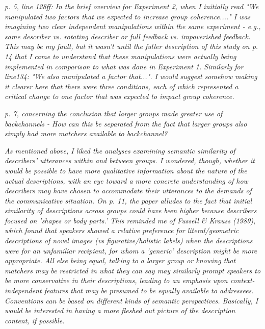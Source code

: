 \documentclass{stanfordletter}
\newcommand{\theysaid}[1]{\begin{leftbar} \noindent 
		\textsl{ #1}\end{leftbar}}
\begin{document}
\begin{letter}{}
          
          \theysaid{p. 5, line 128ff: In the brief overview for Experiment 2, when I initially read "We manipulated two factors that we expected to increase group coherence...." I was imagining two clear independent manipulations within the same experiment - e.g., same describer vs. rotating describer or full feedback vs. impoverished feedback. This may be my fault, but it wasn't until the fuller description of this study on p. 14 that I came to understand that these manipulations were actually being implemented in comparison to what was done in Experiment 1. Similarly for line134: "We also manipulated a factor that...". I would suggest somehow making it clearer here that there were three conditions, each of which represented a critical change to one factor that was expected to impact group coherence.}
          
          \theysaid{p. 7, concerning the conclusion that larger groups made greater use of backchannels - How can this be separated from the fact that larger groups also simply had more matchers available to backchannel?}
          
          \theysaid{As mentioned above, I liked the analyses examining semantic similarity of describers' utterances within and between groups. I wondered, though, whether it would be possible to have more qualitative information about the nature of the actual descriptions, with an eye toward a more concrete understanding of how describers may have chosen to accommodate their utterances to the demands of the communicative situation. On p. 11, the paper alludes to the fact that initial similarity of descriptions across groups could have been higher because describers focused on 'shapes or body parts.' This reminded me of Fussell \& Krauss (1989), which found that speakers showed a relative preference for literal/geometric descriptions of novel images (vs figurative/holistic labels) when the descriptions were for an unfamiliar recipient, for whom a 'generic' description might be more appropriate. All else being equal, talking to a larger group or knowing that matchers may be restricted in what they can say may similarly prompt speakers to be more conservative in their descriptions, leading to an emphasis upon context-independent features that may be presumed to be equally available to addressees. Conventions can be based on different kinds of semantic perspectives. Basically, I would be interested in having a more fleshed out picture of the description content, if possible.}
          

\end{letter}
\end{document}

